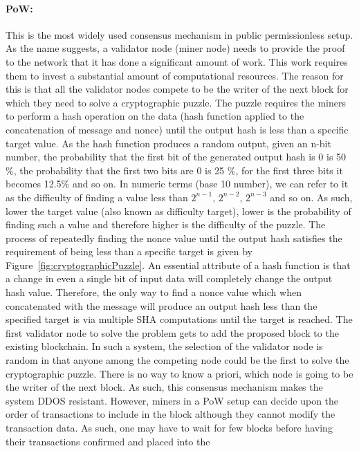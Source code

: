 \paragraph{\ac{PoW}:}This is the most widely used consensus mechanism in public
permissionless setup. As the name suggests, a validator node (miner node) needs
to provide the proof to the network that it has done a significant amount of
work. This work requires them to invest a substantial amount of computational
resources. The reason for this is that all the validator nodes compete to be
the writer of the next block for which they need to solve a cryptographic
puzzle. The puzzle requires the miners to perform a hash operation on the data
(hash function applied to the concatenation of message and nonce) until the
output hash is less than a specific target value. As the hash function produces
a random output, given an n-bit number, the probability that the
first bit of the generated output hash is 0 is 50 \%, the probability that the
first two bits are 0 is 25 \%, for the first three bits it becomes 12.5\% and
so on. In numeric terms (base 10 number), we can refer to it as the difficulty
of finding a value less than $2^{n-1}$, $2^{n-2}$, $2^{n-3}$ and so on. As such,
lower the target value (also known as difficulty target), lower is the
probability of finding such a value and therefore higher is the difficulty of
the puzzle. The process of repeatedly finding the nonce value until the output
hash satisfies the requirement of being less than a specific target is given by
Figure~\ref{fig:cryptographicPuzzle}. An essential attribute of a hash function
is that a change in even a single bit of input data will completely change the
output hash value.  Therefore, the only way to find a nonce value which when
concatenated with the message will produce an output hash less than the
specified target is via multiple SHA computations until the target is reached.
The first validator node to solve the problem gets to add the proposed block to
the existing blockchain.  In such a system, the selection of the validator node
is random in that anyone among the competing node could be the first to solve
the cryptographic puzzle.  There is no way to know a priori, which node is
going to be the writer of the next block. As such, this consensus mechanism
makes the system DDOS resistant.  However, miners in a \ac{PoW} setup can
decide upon the order of transactions to include in the block although they
cannot modify the transaction data. As such, one may have to wait for few
blocks before having their transactions confirmed and placed into the
